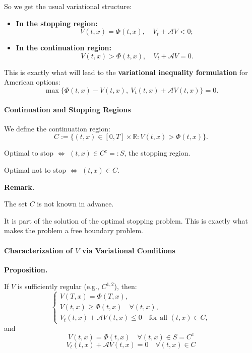 \documentclass[12pt,a4paper]{article}
\theoremstyle{definition}
\begin{document}
So we get the usual variational structure:

\begin{itemize}
\item \textbf{In the stopping region:}
\[
V(t, x) = \Phi(t, x), \quad V_t + \mathcal{A}V < 0;
\]

\item \textbf{In the continuation region:}
\[
V(t, x) > \Phi(t, x), \quad V_t + \mathcal{A}V = 0.
\]
\end{itemize}

This is exactly what will lead to the \textbf{variational inequality formulation} for American options:
\[
\max\{\Phi(t, x) - V(t, x), \ V_t(t, x) + \mathcal{A}V(t, x)\} = 0.
\]

\paragraph{Continuation and Stopping Regions}

We define the continuation region:
\[
C := \{(t, x) \in [0, T] \times \mathbb{R} : V(t, x) > \Phi(t, x)\}.
\]

Optimal to stop $\iff$ $(t, x) \in C^c =: S$, the stopping region.

Optimal not to stop $\iff$ $(t, x) \in C$.

\textbf{Remark.}

The set $C$ is not known in advance.

It is part of the solution of the optimal stopping problem. This is exactly what makes the problem a free boundary problem.

\paragraph{Characterization of $V$ via Variational Conditions}

\textbf{Proposition.}

If $V$ is sufficiently regular (e.g., $C^{1,2}$), then:
\[
\begin{cases}
V(T, x) = \Phi(T, x), \\
V(t, x) \geq \Phi(t, x) \quad \forall (t, x), \\
V_t(t, x) + \mathcal{A}V(t, x) \leq 0 \quad \text{for all } (t, x) \in C,
\end{cases}
\]
and
\begin{equation}
V(t, x) = \Phi(t, x) \quad \forall (t, x) \in S = C^c \tag{*}
\end{equation}
\begin{equation}
V_t(t, x) + \mathcal{A}V(t, x) = 0 \quad \forall (t, x) \in C \tag{**}
\end{equation}
\end{document}
